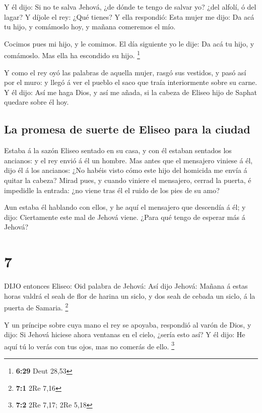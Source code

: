  Y él dijo: Si no te salva Jehová, ¿de dónde te tengo de
salvar yo? ¿del alfolí, ó del lagar?  Y díjole el rey: ¿Qué
tienes? Y ella respondió: Esta mujer me dijo: Da acá tu hijo, y
comámoslo hoy, y mañana comeremos el mío.

 Cocimos pues mi hijo, y le comimos. El día siguiente yo le
dije: Da acá tu hijo, y comámoslo. Mas ella ha escondido su hijo.
\footnote{\textbf{6:29} Deut 28,53}

 Y como el rey oyó las palabras de aquella mujer, rasgó sus
vestidos, y pasó así por el muro: y llegó á ver el pueblo el saco que
traía interiormente sobre su carne.  Y él dijo: Así me haga
Dios, y así me añada, si la cabeza de Eliseo hijo de Saphat quedare
sobre él hoy.

\hypertarget{la-promesa-de-suerte-de-eliseo-para-la-ciudad}{%
\subsection{La promesa de suerte de Eliseo para la
ciudad}\label{la-promesa-de-suerte-de-eliseo-para-la-ciudad}}

 Estaba á la sazón Eliseo sentado en su casa, y con él
estaban sentados los ancianos: y el rey envió á él un hombre. Mas antes
que el mensajero viniese á él, dijo él á los ancianos: ¿No habéis visto
cómo este hijo del homicida me envía á quitar la cabeza? Mirad pues, y
cuando viniere el mensajero, cerrad la puerta, é impedidle la entrada:
¿no viene tras él el ruido de los pies de su amo?

 Aun estaba él hablando con ellos, y he aquí el mensajero
que descendía á él; y dijo: Ciertamente este mal de Jehová viene. ¿Para
qué tengo de esperar más á Jehová?

\hypertarget{section-6}{%
\section{7}\label{section-6}}

 DIJO entonces Eliseo: Oid palabra de Jehová: Así dijo
Jehová: Mañana á estas horas valdrá el seah de flor de harina un siclo,
y dos seah de cebada un siclo, á la puerta de Samaria. \footnote{\textbf{7:1}
  2Re 7,16}

 Y un príncipe sobre cuya mano el rey se apoyaba, respondió
al varón de Dios, y dijo: Si Jehová hiciese ahora ventanas en el cielo,
¿sería esto así? Y él dijo: He aquí tú lo verás con tus ojos, mas no
comerás de ello. \footnote{\textbf{7:2} 2Re 7,17; 2Re 5,18}

